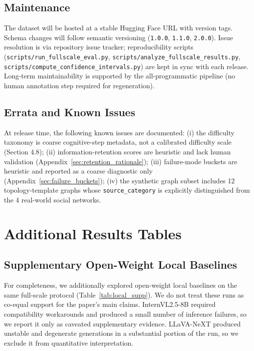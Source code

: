 \documentclass{article}
\begin{document}
\subsection{Maintenance}
The dataset will be hosted at a stable Hugging Face URL with version tags. Schema changes will follow semantic versioning (\texttt{1.0.0}, \texttt{1.1.0}, \texttt{2.0.0}). Issue resolution is via repository issue tracker; reproducibility scripts (\texttt{scripts/run\_fullscale\_eval.py}, \texttt{scripts/analyze\_fullscale\_results.py}, \texttt{scripts/compute\_confidence\_intervals.py}) are kept in sync with each release. Long-term maintainability is supported by the all-programmatic pipeline (no human annotation step required for regeneration).

\subsection{Errata and Known Issues}
At release time, the following known issues are documented: (i) the difficulty taxonomy is coarse cognitive-step metadata, not a calibrated difficulty scale (Section 4.8); (ii) information-retention scores are heuristic and lack human validation (Appendix~\ref{sec:retention_rationale}); (iii) failure-mode buckets are heuristic and reported as a coarse diagnostic only (Appendix~\ref{sec:failure_buckets}); (iv) the synthetic graph subset includes 12 topology-template graphs whose \texttt{source\_category} is explicitly distinguished from the 4 real-world social networks.

\section{Additional Results Tables}
\subsection{Supplementary Open-Weight Local Baselines}
For completeness, we additionally explored open-weight local baselines on the same full-scale protocol (Table~\ref{tab:local_supp}). We do not treat these runs as co-equal support for the paper's main claims. InternVL2.5-8B required compatibility workarounds and produced a small number of inference failures, so we report it only as caveated supplementary evidence. LLaVA-NeXT produced unstable and degenerate generations in a substantial portion of the run, so we exclude it from quantitative interpretation.
\end{document}
